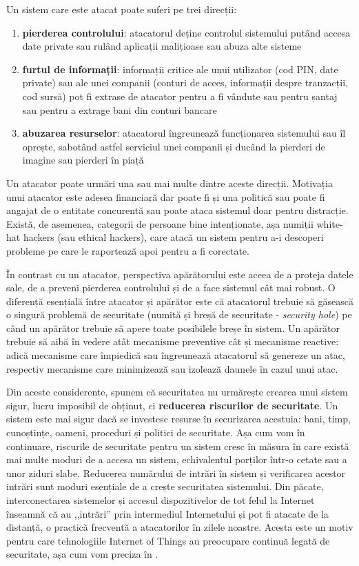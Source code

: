 Un sistem care este atacat poate suferi pe trei direcții:
\begin{enumerate}
  \item \textbf{pierderea controlului}: atacatorul deține controlul sistemului putând accesa date private sau rulând aplicații malițioase sau abuza alte sisteme
  \item \textbf{furtul de informații}: informații critice ale unui utilizator (cod PIN, date private) sau ale unei companii (conturi de acces, informații despre tranzacții, cod sursă) pot fi extrase de atacator pentru a fi vândute sau pentru șantaj sau pentru a extrage bani din conturi bancare
  \item \textbf{abuzarea resurselor}: atacatorul îngreunează funcționarea sistemului sau îl oprește, sabotând astfel serviciul unei companii și ducând la pierderi de imagine sau pierderi în piață
\end{enumerate}

Un atacator poate urmări una sau mai multe dintre aceste direcții. Motivația unui atacator este adesea financiară dar poate fi și una politică sau poate fi angajat de o entitate concurentă sau poate ataca sistemul doar pentru distracție. Există, de asemenea, categorii de persoane bine intenționate, așa numiții white-hat hackers (sau ethical hackers), care atacă un sistem pentru a-i descoperi probleme pe care le raportează apoi pentru a fi corectate.

În contrast cu un atacator, perspectiva apărătorului este aceea de a proteja datele sale, de a preveni pierderea controlului și de a face sistemul cât mai robust. O diferență esențială între atacator și apărător este că atacatorul trebuie să găsească o singură problemă de securitate (numită și breșă de securitate - \textit{security hole}) pe când un apărător trebuie să apere toate posibilele breșe în sistem. Un apărător trebuie să aibă în vedere atât mecanisme preventive cât și mecanisme reactive: adică mecanisme care împiedică sau îngreunează atacatorul să genereze un atac, respectiv mecanisme care minimizează sau izolează daunele în cazul unui atac.

Din aceste considerente, spunem că securitatea nu urmărește crearea unui sistem sigur, lucru imposibil de obținut, ci \textbf{reducerea riscurilor de securitate}. Un sistem este mai sigur dacă se investesc resurse în securizarea acestuia: bani, timp, cunoștințe, oameni, proceduri și politici de securitate. Așa cum vom în continuare, riscurile de securitate pentru un sistem cresc în măsura în care există mai multe moduri de a accesa un sistem, echivalentul porților într-o cetate sau a unor ziduri slabe. Reducerea numărului de intrări în sistem și verificarea acestor intrări sunt moduri esențiale de a crește securitatea sistemului. Din păcate, interconectarea sistemelor și accesul dispozitivelor de tot felul la Internet înseamnă că au ,,intrări'' prin intermediul Internetului și pot fi atacate de la distanță, o practică frecventă a atacatorilor în zilele noastre. Acesta este un motiv pentru care tehnologiile Internet of Things au preocupare continuă legată de securitate, așa cum vom preciza în .

